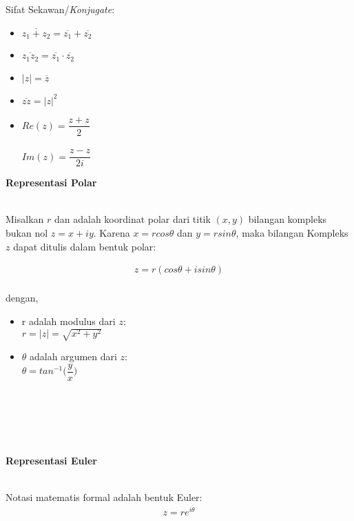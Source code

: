 \documentclass{article}
\begin{document}
    Sifat Sekawan/\textit{Konjugate}:
    \begin{itemize}
        \item $\overline{z_1 + z_2} = \overline{z_1} + \overline{z_2}$
        \item $\overline{z_1 z_2} = \overline{z_1} \cdot \overline{z_2}$
        \item $|z| = \overline{z}$
        \item $\overline{zz} = |z|^2$
        \item $Re(z) = \dfrac{z+z}{2}$\\ \\
            $Im(z) = \dfrac{z-z}{2i}$
    \end{itemize}

    \newpage
    \begin{center}
        \textbf{Representasi Polar}
    \end{center}
    \leavevmode\\

    Misalkan $r$ dan adalah koordinat polar dari titik $(x, y)$ bilangan kompleks bukan nol $z = x + iy$. Karena $x = r cos \theta $ dan $y = r sin \theta$, maka bilangan Kompleks $z$ dapat
    ditulis dalam bentuk polar:

    \begin{align}
        z = r(cos \theta + i sin \theta)\\\nonumber
    \end{align}

    dengan,
    \begin{itemize}
        \item r adalah modulus dari $z$:\\
            $ r = |z| = \sqrt{x^2+y^2} $
        \item $\theta$ adalah argumen dari $z$:\\
            $ \theta = tan^{-1} \bigg(\dfrac{y}{x}\bigg) $
    \end{itemize}

    \leavevmode
    \\ \\ \\ \\

    \begin{center}
        \textbf{Representasi Euler}
    \end{center}
    \leavevmode\\

    Notasi matematis formal adalah bentuk Euler:
    \begin{align}
        z = re^{i\theta}\\\nonumber
    \end{align}
\end{document}
